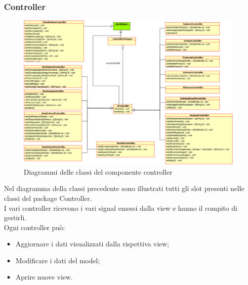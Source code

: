 		\begin{landscape}
			\subsubsection{Controller}
			\label{vista_controller}
			\begin{figure}[!h]
				\centering
				\includegraphics[scale=0.50]{./Content/Immagini/Controller.png}
				\caption{Diagrammi delle classi del componente controller}
				\label{img_controller}
			\end{figure}
		\end{landscape}
		Nel diagramma della classi precedente sono illustrati tutti gli slot presenti nelle classi del package\g{} Controller.
		\\I vari controller ricevono i vari signal\g{} emessi dalla view e hanno il compito di gestirli.
		\\Ogni controller può:
			\begin{itemize}
				\item Aggiornare i dati visualizzati dalla rispettiva view;
				\item Modificare i dati del model;
				\item Aprire nuove view.
			\end{itemize}